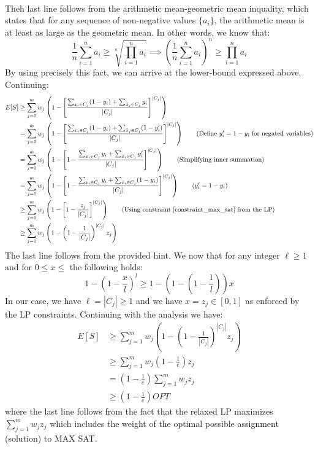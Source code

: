 \documentclass[12pt]{exam}
\begin{document}
\begin{questions}
\begin{solution}
\begin{enumerate}[label=(\alph*)]
\begin{align*}
      \end{align*}
      Theh last line follows from the arithmetic mean-geometric mean inquality, which states that for any sequence of non-negative values $\{a_i\}$, the arithmetic mean is at least as large as the geometric mean. In other words, we know that:
      \[
        \frac{1}{n}\sum_{i=1}^n a_i \geq \sqrt[n]{\prod_{i=1}^n a_i} \implies  \left(\frac{1}{n}\sum_{i=1}^n a_i\right)^n \geq \prod_{i=1}^n a_i
      \]
      By using precisely this fact, we can arrive at the lower-bound expressed above. Continuing:
      \begin{align*}
        E[S] &\geq \sum_{j=1}^m w_j \left(1 - \left[\frac{\sum_{x_i \in C_j} (1 - y_i) + \sum_{\bar{x}_j \in C_j} y_i}{|C_j|} \right]^{|C_j|} \right) \\
        &= \sum_{j=1}^m w_j \left(1 - \left[\frac{\sum_{x_i \in C_j} (1 - y_i) + \sum_{\bar{x}_j \in C_j} (1 - y_i')}{|C_j|} \right]^{|C_j|} \right) \tag{Define $y_i' = 1 - y_i$ for negated variables} \\
        &=  \sum_{j=1}^m w_j \left(1 - \left[1 - \frac{\sum_{x_i \in C_j} y_i + \sum_{\bar{x}_i \in C_j} y_i'}{|C_j|} \right]^{|C_j|} \right) \tag{Simplifying inner summation} \\
        &=  \sum_{j=1}^m w_j \left(1 - \left[1 - \frac{\sum_{x_i \in C_j} y_i + \sum_{\bar{x}_i \in C_j} (1 - y_i)}{|C_j|} \right]^{|C_j|} \right) \tag{$y_i' = 1 - y_i$} \\  
        &\geq \sum_{j=1}^m w_j \left(1 - \left[1 - \frac{z_j}{|C_j|} \right]^{|C_j|} \right) \tag{Using constraint \ref{constraint_max_sat} from the LP} \\
        &\geq \sum_{j=1}^m w_j \left(1 - \left(1 - \frac{1}{|C_j|} \right)^{|C_j|} z_j \right)
      \end{align*}
      The last line follows from the provided hint. We now that for any integer $\ell \geq 1$ and for $0 \leq x \leq$ the following holds:
      \[
        1 - \left(1 - \frac{x}{l} \right)^l \geq 1 - \left( 1 - \left(1 - \frac{1}{l}\right) \right)x
      \]
      In our case, we have $\ell = |C_j| \geq 1$ and we have $x = z_j \in [0,1]$ as enforced by the LP constraints. Continuing with the analysis we have:
      \begin{align*}
        E[S] &\geq \sum_{j=1}^m w_j \left(1 - \left(1 - \frac{1}{|C_j|} \right)^{|C_j|} z_j \right) \\
        &\geq \sum_{j=1}^m w_j \left( 1 - \frac{1}{e} \right) z_j \tag{Mathematical fact (3) as provided, using $k = |C_j| \geq 1$} \\
        &=\left( 1- \frac{1}{e}\right) \sum_{j=1}^m w_jz_j \tag{Simplifying} \\
        &\geq \left(1 - \frac{1}{e} \right) OPT 
      \end{align*}
      where the last line follows from the fact that the relaxed LP maximizes $\sum_{j=1}^m w_j z_j$ which includes the weight of the optimal possible assignment (solution) to MAX SAT.


\end{enumerate}
\end{solution}
\end{questions}
\end{document}
